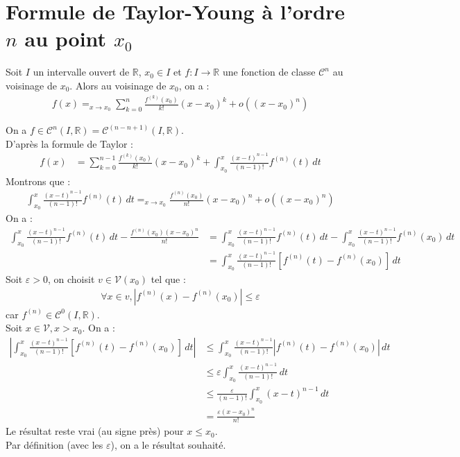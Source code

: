 \documentclass[../main.tex]{subfiles}
\begin{document}
\section{Formule de Taylor-Young à l'ordre $n$ au point $x_0$}
\begin{tcolorbox}[title=Théorème 25.27, title filled=false, colframe=orange, colback=orange!10!white]
    Soit $I$ un intervalle ouvert de $\mathbb{R}$, $x_0\in I$ et $f:I \to \mathbb{R}$ une fonction de classe $\mathcal{C}^n$ au voisinage de $x_0$. Alors au voisinage de $x_0$, on a : 
    \begin{align*}
        f(x) =_{x\to x_0} \sum_{k=0}^{n} \frac{f^{(k)}(x_0)}{k!} (x - x_0)^k + o((x-x_0)^n)
    \end{align*}
\end{tcolorbox}

\noindent On a $f \in \mathcal{C}^n(I, \mathbb{R}) = \mathcal{C}^{(n-n+1)}(I, \mathbb{R})$. \\
D'après la formule de Taylor : 
\begin{align*}
    f(x) &= \sum_{k=0}^{n-1} \frac{f^{(k)}(x_0)}{k!} (x - x_0)^k + \int_{x_0}^{x} \frac{(x-t)^{n-1}}{(n-1)!} f^{(n)}(t) \, dt
\end{align*}
Montrons que : 
\begin{align*}
    \int_{x_0}^{x} \frac{(x-t)^{n-1}}{(n-1)!} f^{(n)}(t) \, dt =_{x\to x_0} \frac{f^{(n)}(x_0)}{n!} (x-x_0)^n + o((x-x_0)^n)
\end{align*}
On a : 
\begin{align*}
    \int_{x_0}^{x} \frac{(x - t)^{n-1}}{(n-1)!} f^{(n)}(t) \, dt - \frac{f^{(n)}(x_0)(x - x_0)^n}{n!} &= \int_{x_0}^{x} \frac{(x - t)^{n-1}}{(n-1)!} f^{(n)}(t) \, dt - \int_{x_0}^{x} \frac{(x - t)^{n-1}}{(n-1)!} f^{(n)}(x_0) \, dt \\
    &= \int_{x_0}^{x} \frac{(x - t)^{n-1}}{(n-1)!} [f^{(n)}(t) - f^{(n)}(x_0)] \, dt
\end{align*}
Soit $\varepsilon > 0$, on choisit $v\in \mathcal{V}(x_0)$ tel que :
\begin{align*}
    \forall x \in v, |f^{(n)}(x) - f^{(n)}(x_0)| \leq \varepsilon
\end{align*}
car $f^{(n)} \in \mathcal{C}^0(I, \mathbb{R})$. \\
Soit $x\in \mathcal{V}, x > x_0$. On a : 
\begin{align*}
    \left| \int_{x_0}^{x} \frac{(x - t)^{n-1}}{(n-1)!} [f^{(n)}(t) - f^{(n)}(x_0)] \, dt \right| &\leq \int_{x_0}^{x} \frac{(x - t)^{n-1}}{(n-1)!} |f^{(n)}(t) - f^{(n)}(x_0)| \, dt \\
    &\leq \varepsilon \int_{x_0}^{x} \frac{(x - t)^{n-1}}{(n-1)!} \, dt \\
    &\leq \frac{\varepsilon}{(n-1)!} \int_{x_0}^{x} (x - t)^{n-1} \, dt \\
    &= \frac{\varepsilon(x-x_0)^n}{n!}
\end{align*}
Le résultat reste vrai (au signe près) pour $x \leq x_0$. \\
Par définition (avec les $\varepsilon$), on a le résultat souhaité. 
\end{document}
